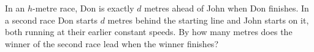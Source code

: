 In an $h$-metre race, Don is exactly $d$ metres ahead of John when Don finishes. In a second race Don starts $d$ metres behind the starting line and John starts on it, both running at their earlier constant speeds. By how many metres does the winner of the second race lead when the winner finishes?
